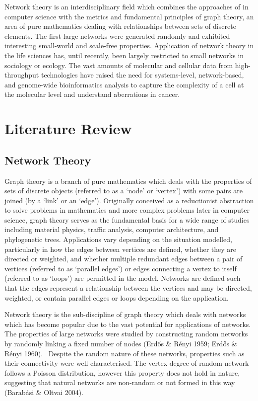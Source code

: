 Network theory is an interdisciplinary field which combines the
approaches of in computer science with the metrics and fundamental
principles of graph theory, an area of pure mathematics dealing with
relationships between sets of discrete elements. The first large
networks were generated randomly and exhibited interesting small-world
and scale-free properties. Application of network theory in the life
sciences has, until recently, been largely restricted to small networks
in sociology or ecology. The vast amounts of molecular and cellular
data from high-throughput technologies have raised the need for
systems-level, network-based, and genome-wide bioinformatics analysis
to capture the complexity of a cell at the molecular level and
understand aberrations in cancer. 



\section{Literature Review}
\subsection{Network Theory}

Graph theory is a branch of pure
mathematics which deals with the properties of sets of discrete objects
(referred to as a {\textquoteleft}node{\textquoteright} or
{\textquoteleft}vertex{\textquoteright}) with some pairs are joined (by
a {\textquoteleft}link{\textquoteright} or an
{\textquoteleft}edge{\textquoteright}). Originally conceived as a
reductionist abstraction to solve problems in mathematics and more
complex problems later in computer science, graph theory serves as the
fundamental basis for a wide range of studies including material
physics, traffic analysis, computer architecture, and phylogenetic
trees. Applications vary depending on the situation modelled,
particularly in how the edges between vertices are defined, whether
they are directed or weighted, and whether multiple redundant edges
between a pair of vertices (referred to as {\textquoteleft}parallel
edges{\textquoteright}) or edges connecting a vertex to itself
(referred to as {\textquoteleft}loops{\textquoteright}) are permitted
in the model. Networks are defined such that the edges represent a
relationship between the vertices and may be directed, weighted, or
contain parallel edges or loops depending on the application. 


Network theory is the sub-discipline of graph theory which deals with
networks which has become popular due to the vast potential for
applications of networks. The properties of large networks were
studied by constructing random networks by randomly linking a fixed
number of nodes (Erd\H{o}s \& R\'enyi 1959; Erd\H{o}s \& R\'enyi 1960).
\ Despite the random nature of these networks, properties such as their
connectivity were well characterised. The vertex degree of random
network follows a Poisson distribution, however this property does not
hold in nature, suggesting that natural networks are non-random or not
formed in this way (Barab\'asi \& Oltvai 2004). 


